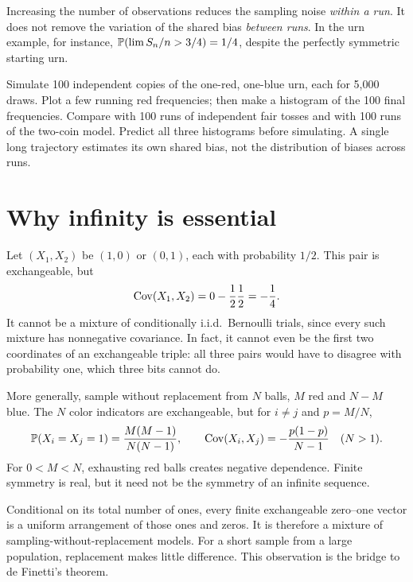 Increasing the number of observations reduces the sampling noise \emph{within a run}. It does not remove the variation of the shared bias \emph{between runs}. In the urn example, for instance, $\P(\lim S_n/n>3/4)=1/4$, despite the perfectly symmetric starting urn.

\begin{labbox}[title={Explore: one long run versus many runs}]
Simulate 100 independent copies of the one-red, one-blue urn, each for 5,000 draws. Plot a few running red frequencies; then make a histogram of the 100 final frequencies. Compare with 100 runs of independent fair tosses and with 100 runs of the two-coin model. Predict all three histograms before simulating. A single long trajectory estimates its own shared bias, not the distribution of biases across runs.
\end{labbox}

\section{Why infinity is essential}

\begin{example}
Let $(X_1,X_2)$ be $(1,0)$ or $(0,1)$, each with probability $1/2$. This pair is exchangeable, but
\[
\Cov(X_1,X_2)=0-\frac12\frac12=-\frac14.
\]
It cannot be a mixture of conditionally i.i.d.\ Bernoulli trials, since every such mixture has nonnegative covariance. In fact, it cannot even be the first two coordinates of an exchangeable triple: all three pairs would have to disagree with probability one, which three bits cannot do.
\end{example}

More generally, sample without replacement from $N$ balls, $M$ red and $N-M$ blue. The $N$ color indicators are exchangeable, but for $i\ne j$ and $p=M/N$,
\[
\P(X_i=X_j=1)=\frac{M(M-1)}{N(N-1)},\qquad
\Cov(X_i,X_j)=-\frac{p(1-p)}{N-1}\quad(N>1).
\]
For $0<M<N$, exhausting red balls creates negative dependence. Finite symmetry is real, but it need not be the symmetry of an infinite sequence.

\begin{bigidea}[title={The finite bridge}]
Conditional on its total number of ones, every finite exchangeable zero--one vector is a uniform arrangement of those ones and zeros. It is therefore a mixture of sampling-without-replacement models. For a short sample from a large population, replacement makes little difference. This observation is the bridge to de Finetti's theorem.
\end{bigidea}

